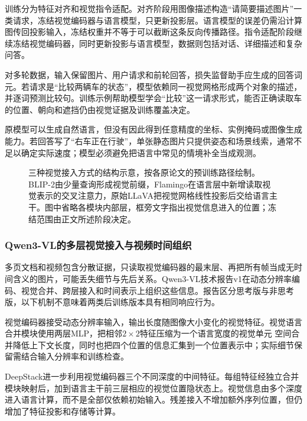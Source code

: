训练分为特征对齐和视觉指令适配。对齐阶段用图像描述构造“请简要描述图片”一类请求，冻结视觉编码器与语言模型，只更新投影层。语言模型的误差仍需沿计算图传回投影输入，冻结权重并不等于可以截断这条反向传播路径。指令适配阶段继续冻结视觉编码器，同时更新投影与语言模型，数据则包括对话、详细描述和复杂问答。

对多轮数据，输入保留图片、用户请求和前轮回答，损失监督助手应生成的回答词元。若请求是“比较两辆车的状态”，模型依赖同一视觉网格形成两个对象的描述，并逐词预测比较句。训练示例帮助模型学会“比较”这一请求形式，能否正确读取车的位置、朝向和遮挡仍由视觉证据及训练覆盖决定。

原模型可以生成自然语言，但没有因此得到任意精度的坐标、实例掩码或图像生成能力。若回答写了“右车正在行驶”，单张静态图片只提供姿态和场景线索，通常不足以确定实际速度；模型必须避免把语言中常见的情境补全当成观测。

\begin{figure}[htbp]
  \centering
  
  \caption{三种视觉接入方式的结构示意，按各原论文的预训练路径绘制。BLIP-2由少量查询形成视觉前缀，Flamingo在语言层中新增读取视觉表示的交叉注意力，原始LLaVA把视觉网格线性投影后交给语言主干。图中省略各模块内部层，框旁文字指出视觉信息进入的位置；冻结范围由正文所述阶段决定。}
  \label{fig:vision-language-connectors}
\end{figure}
\FloatBarrier

\subsubsection{Qwen3-VL的多层视觉接入与视频时间组织}
\label{sec:vision-models-qwen3vl}

多页文档和视频包含分散证据，只读取视觉编码器的最末层、再把所有帧当成无时间含义的图片，可能丢失细节与先后关系。Qwen3-VL技术报告v1在动态分辨率编码、视觉合并、跨层接入和时间表示上组织这些信息。报告区分思考版与非思考版，以下机制不意味着两类后训练版本具有相同响应行为。

视觉编码器接受动态分辨率输入，输出长度随图像大小变化的视觉特征。视觉语言合并模块使用两层MLP，把相邻$2\times2$特征压缩为一个语言宽度的视觉单元
空间合并降低上下文长度，同时也把四个位置的信息汇集到一个位置表示中；实际细节保留需结合输入分辨率和训练检查。

DeepStack进一步利用视觉编码器三个不同深度的中间特征。每组特征经独立合并模块映射后，加到语言主干前三层相应的视觉位置隐状态上。视觉信息由多个深度进入语言计算，而不是全部仅依赖初始输入。残差接入不增加额外序列位置，但仍增加了特征投影和存储等计算。

